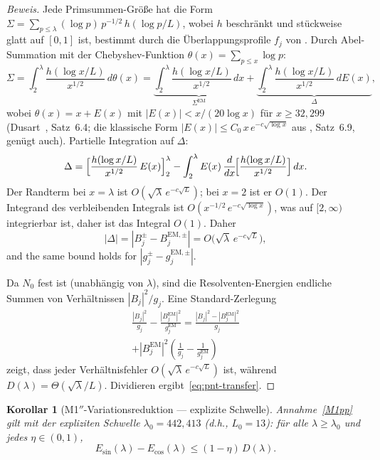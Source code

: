 ﻿\documentclass[12pt,a4paper]{article}
\newtheorem{corollary}[theorem]{Korollar}
\theoremstyle{definition}
\theoremstyle{remark}
\begin{document}
\begin{proof}[Beweis]
Jede Primsummen-Größe hat die Form $\Sigma = \sum_{p \leq \lambda} (\log p)\,p^{-1/2}\,h(\log p/L)$, wobei $h$ beschränkt und stückweise glatt auf $[0,1]$ ist, bestimmt durch die Überlappungsprofile $f_j$ von . Durch Abel-Summation mit der Chebyshev-Funktion $\theta(x) = \sum_{p \leq x} \log p$:
\[
  \Sigma = \int_2^{\lambda} \frac{h(\log x/L)}{x^{1/2}}\,d\theta(x)
  = \underbrace{\int_2^{\lambda} \frac{h(\log x/L)}{x^{1/2}}\,dx}_{\Sigma^{\mathrm{EM}}}
  + \underbrace{\int_2^{\lambda} \frac{h(\log x/L)}{x^{1/2}}\,dE(x)}_{\Delta},
\]
wobei $\theta(x) = x + E(x)$ mit $|E(x)| < x/(20\log x)$ für $x \geq 32{,}299$ (Dusart~\cite{Dusart2010}, Satz~6.4; die klassische Form $|E(x)| \leq C_0\,x\,e^{-c\sqrt{\log x}}$ aus \cite{IwaniecKowalski2004}, Satz~6.9, genügt auch). Partielle Integration auf $\Delta$:
\[
  \Delta = \Bigl[\frac{h(\log x/L)}{x^{1/2}}\,E(x)\Bigr]_2^{\lambda}
  - \int_2^{\lambda} E(x)\,\frac{d}{dx}\!\Bigl[\frac{h(\log x/L)}{x^{1/2}}\Bigr]\,dx.
\]
Der Randterm bei $x = \lambda$ ist $O(\sqrt{\lambda}\,e^{-c\sqrt{L}})$; bei $x = 2$ ist er $O(1)$. Der Integrand des verbleibenden Integrals ist $O(x^{-1/2}\,e^{-c\sqrt{\log x}})$, was auf $[2,\infty)$ integrierbar ist, daher ist das Integral $O(1)$. Daher
\begin{equation}
\label{eq:pnt-error}
  |\Delta| = |B_j^{\pm} - B_j^{\mathrm{EM},\pm}| = O\!\bigl(\sqrt{\lambda}\,e^{-c\sqrt{L}}\bigr),
\end{equation}
and the same bound holds for $|g_j^{\pm} - g_j^{\mathrm{EM},\pm}|$.

Da $N_0$ fest ist (unabhängig von $\lambda$), sind die Resolventen-Energien endliche Summen von Verhältnissen $|B_j|^2/g_j$. Eine Standard-Zerlegung
\begin{multline*}
  \frac{|B_j|^2}{g_j} - \frac{|B_j^{\mathrm{EM}}|^2}{g_j^{\mathrm{EM}}}
  = \frac{|B_j|^2 - |B_j^{\mathrm{EM}}|^2}{g_j} \\
  + |B_j^{\mathrm{EM}}|^2\!\left(\frac{1}{g_j} - \frac{1}{g_j^{\mathrm{EM}}}\right)
\end{multline*}
zeigt, dass jeder Verhältnisfehler $O(\sqrt{\lambda}\,e^{-c\sqrt{L}})$ ist, während $D(\lambda) = \Theta(\sqrt{\lambda}/L)$. Dividieren ergibt~\eqref{eq:pnt-transfer}.
\end{proof}

\begin{corollary}[M1$''$-Variationsreduktion --- explizite Schwelle]
\label{cor:M1-proved}
Annahme~\ref{M1pp} gilt mit der expliziten Schwelle $\lambda_0 = 442{,}413$ (d.h., $L_0 = 13$): für alle $\lambda \geq \lambda_0$ und jedes $\eta \in (0,1)$,
\[
  E_{\sin}(\lambda) - E_{\cos}(\lambda) \leq (1-\eta)\,D(\lambda).
\]
\end{corollary}
\end{document}
